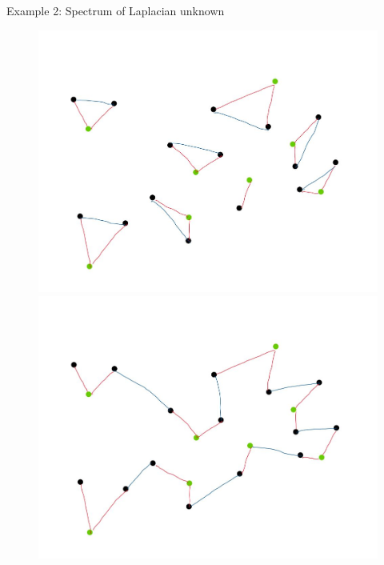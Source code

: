 \documentclass{beamer}
\begin{document}
\begin{frame}{Example 2: Spectrum of Laplacian unknown}
\begin{figure}[!htb]
\begin{minipage}{.5\textwidth}
	\end{minipage}%
	\begin{minipage}{0.5\textwidth}
		\centering
		\includegraphics[scale=0.32]{figures/graph_example_4.jpg}\\
		\centering
		\includegraphics[scale=0.32]{figures/graph_example_5.jpg}
	\end{minipage}
\end{figure}
\end{frame}
\end{document}
